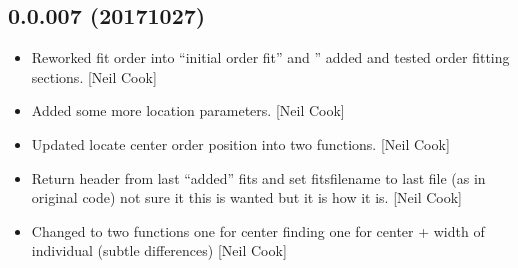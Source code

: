 \documentclass[a4paper,10pt,english]{report}
\begin{document}
\subsection{0.0.007 (2017\sphinxhyphen{}10\sphinxhyphen{}27)}
\label{\detokenize{misc/changelog:id563}}\begin{itemize}
\item {} 
Reworked fit order into “initial order fit” and ”
added and tested order fitting sections. {[}Neil Cook{]}

\item {} 
Added some more location parameters. {[}Neil Cook{]}

\item {} 
Updated locate center order position into two functions. {[}Neil Cook{]}

\item {} 
Return header from last “added” fits and set fitsfilename to last file
(as in original code) \sphinxhyphen{} not sure it this is wanted but it is how it
is. {[}Neil Cook{]}

\item {} 
Changed  to two functions one for center
finding one for center + width of individual (subtle differences)
{[}Neil Cook{]}

\end{itemize}
\end{document}
